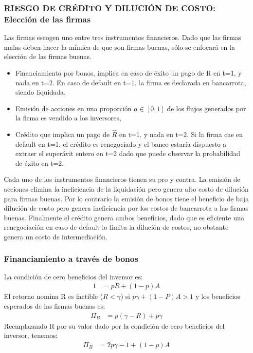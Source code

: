 \documentclass[10pt, xcolor=table, x11names]{beamer}
\begin{document}
\begin{frame}
    \frametitle{{\normalsize RIESGO DE CRÉDITO Y DILUCIÓN DE COSTO: Elección de las firmas} {}}
    Las firmas escogen uno entre tres instrumentos financieros. Dado que las firmas malas deben hacer la mímica de que son firmas buenas, sólo se enfocará en la elección de las firmas buenas.\\
    \begin{itemize}
        \item Financiamiento por bonos, implica en caso de éxito un pago de R en t=1, y nada en t=2. En caso de default en t=1, la firma es declarada en bancarrota, siendo liquidada.
        \item Emisión de acciones en una proporción $a \in \left[0, 1 \right] $ de los flujos generados por la firma es vendido a los inversores,
        \item Crédito que implica un pago de $\hat{R}$ en t=1, y nada en t=2. Si la firma cae en default en t=1, el crédito es renegociado y el banco estaría dispuesto a extraer el superávit entero en t=2 dado que puede observar la probabilidad de éxito en t=2.
    \end{itemize}  
Cada uno de los instrumentos financieros tienen su pro y contra. La emisión de acciones elimina la ineficiencia de la liquidación pero genera alto costo de dilución para firmas buenas. Por lo contrario la emisión de bonos tiene el beneficio de baja dilución de costo pero genera ineficiencia por los costos de bancarrota a las firmas buenas. Finalmente el crédito genera ambos beneficios, dado que es eficiente una renegociación en caso de default lo limita la dilución de costos, no obstante genera un costo de intermediación.  

\end{frame}

\begin{frame}
    \frametitle{{\normalsize Financiamiento a través de bonos} {}}
     
     La condición de cero beneficios del inversor es:
     \begin{align}
    1&=pR+(1-p)A 
     \end{align}
    El retorno nomina R es factible ($R<\gamma$) si $p\gamma +(1-P)A>1$ y los beneficios esperados de las firmas buenas es:
    \begin{align}
     \Pi_{B}&=p(\gamma - R)+p\gamma
    \end{align}
    Reemplazando R por su valor dado por la condición de cero beneficios del inversor, tenemos:
    \begin{align}
    \Pi_{B}&=2p\gamma-1+(1-p)A
    \end{align}
\end{frame}
\end{document}

